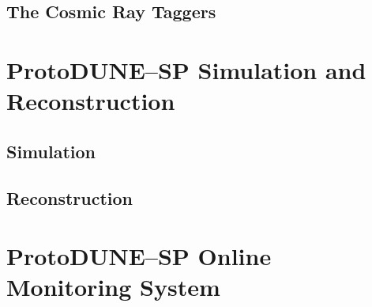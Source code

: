 \subsection{The Cosmic Ray Taggers}


\section{ProtoDUNE--SP Simulation and Reconstruction} \label{sec:pdsp_sim_reco}

\subsection{Simulation}

\subsection{Reconstruction}

\section{ProtoDUNE--SP Online Monitoring System} \label{sec:pdsp_om}

